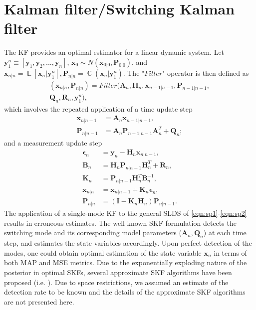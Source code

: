 \documentclass[journal]{IEEEtran}
\DeclareMathOperator{\E}{\mathbb{E}}
\DeclareMathOperator{\C}{\mathbb{C}}
\begin{document}
\section{Kalman filter/Switching Kalman filter}\label{section:skf}
 The KF provides an optimal estimator for a linear dynamic system. Let $\bm{y}_1^n\equiv [\bm{y}_1,\bm{y}_2,...,\bm{y}_n]$, $\bm{x}_0\sim N(\bm{x}_{0|0},\bm{P}_{0|0})$, and $\bm{x}_{n|n}=\E[\bm{x}_n|\bm{y}_1^n],\bm{P}_{n|n}=\C(\bm{x}_n|\bm{y}_1^n)$. The "$Filter$" operator is then defined as
\begin{multline}
    (\bm{x}_{n|n},\bm{P}_{n|n}) = Filter(\bm{A}_n,\bm{H}_n,\bm{x}_{n-1|n-1},\bm{P}_{n-1|n-1}, \\ \bm{Q}_n,\bm{R}_n,\bm{y}_1^n), \label{eqn:filter}
\end{multline}
which involves the repeated application of a time update step
\begin{align}
\bm{x}_{n|n-1} &= \bm{A}_n \bm{x}_{n-1|n-1}, \label{eqn: Kalman1}\\
\bm{P}_{n|n-1}&= \bm{A}_n \bm{P}_{n-1|n-1}\bm{A}_n^T + \bm{Q}_n;
\end{align}
and a measurement update step
\begin{align}
\bm{\epsilon}_n &= \bm{y}_n - \bm{H}_n \bm{x}_{n|n-1}, \\
\bm{B}_n &= \bm{H}_n \bm{P}_{n|n-1} \bm{H}_n^T + \bm{R}_n,\\
\bm{K}_n &= \bm{P}_{n|n-1} \bm{H}_n^T \bm{B}_n^{-1},\\
\bm{x}_{n|n} &= \bm{x}_{n|n-1} + \bm{K}_n \bm{\epsilon}_n,\\
\bm{P}_{n|n} &= (\bm{I} - \bm{K}_n \bm{H}_n) \bm{P}_{n|n-1}. \label{eqn:Kalmanend} 
\end{align}
  The application of a single-mode KF to the general SLDS of \eqref{eqn:sp1}-\eqref{eqn:sp2} results in erroneous estimates. The well known SKF formulation detects the switching mode and its corresponding model parameters ($\bm{A}_n,\bm{Q}_n$) at each time step, and estimates the state variables accordingly. Upon perfect detection of the modes, one could obtain optimal estimation of the state variable $\bm{x}_n$ in terms of both MAP and MSE metrics. Due to the exponentially exploding nature of the posterior in optimal SKFs\cite{SKF}, several approximate SKF algorithms have been proposed (i.e. \cite{SKF,imm}). Due to space restrictions, we assumed an estimate of the detection rate to be known and the details of the approximate SKF algorithms are not presented here. 
\end{document}
